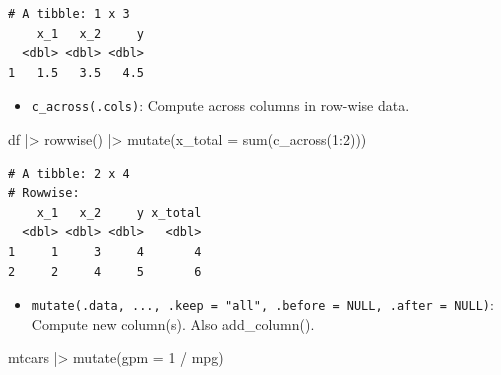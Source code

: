 \documentclass[
  letterpaper,
  DIV=11,
  numbers=noendperiod]{scrreprt}
\newenvironment{Shaded}{\begin{snugshade}}{\end{snugshade}}
\newcommand{\AttributeTok}[1]{\textcolor[rgb]{0.40,0.45,0.13}{#1}}
\newcommand{\DecValTok}[1]{\textcolor[rgb]{0.68,0.00,0.00}{#1}}
\newcommand{\FunctionTok}[1]{\textcolor[rgb]{0.28,0.35,0.67}{#1}}
\newcommand{\NormalTok}[1]{\textcolor[rgb]{0.00,0.23,0.31}{#1}}
\newcommand{\SpecialCharTok}[1]{\textcolor[rgb]{0.37,0.37,0.37}{#1}}
\providecommand{\tightlist}{%
  \setlength{\itemsep}{0pt}\setlength{\parskip}{0pt}}\usepackage{longtable,booktabs,array}
\begin{document}
\begin{verbatim}
# A tibble: 1 x 3
    x_1   x_2     y
  <dbl> <dbl> <dbl>
1   1.5   3.5   4.5
\end{verbatim}

\begin{itemize}
\tightlist
\item
  \texttt{c\_across(.cols)}: Compute across columns in row-wise data.
\end{itemize}

\begin{Shaded}
\begin{Highlighting}[]
\NormalTok{df }\SpecialCharTok{|\textgreater{}} 
  \FunctionTok{rowwise}\NormalTok{() }\SpecialCharTok{|\textgreater{}}
  \FunctionTok{mutate}\NormalTok{(}\AttributeTok{x\_total =} \FunctionTok{sum}\NormalTok{(}\FunctionTok{c\_across}\NormalTok{(}\DecValTok{1}\SpecialCharTok{:}\DecValTok{2}\NormalTok{)))}
\end{Highlighting}
\end{Shaded}

\begin{verbatim}
# A tibble: 2 x 4
# Rowwise: 
    x_1   x_2     y x_total
  <dbl> <dbl> <dbl>   <dbl>
1     1     3     4       4
2     2     4     5       6
\end{verbatim}

\begin{itemize}
\tightlist
\item
  \texttt{mutate(.data,\ ...,\ .keep\ =\ "all",\ .before\ =\ NULL,\ .after\ =\ NULL)}:
  Compute new column(s). Also add\_column().
\end{itemize}

\begin{Shaded}
\begin{Highlighting}[]
\NormalTok{mtcars }\SpecialCharTok{|\textgreater{}} \FunctionTok{mutate}\NormalTok{(}\AttributeTok{gpm =} \DecValTok{1} \SpecialCharTok{/}\NormalTok{ mpg)}
\end{Highlighting}
\end{Shaded}
\end{document}
